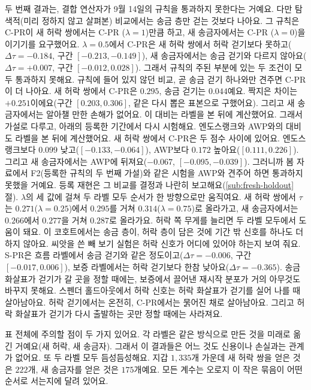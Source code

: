 

두 번째 결과는, 결합 연산자가 9월 14일의 규칙을 통과하지 못한다는 거예요. 다만 탐색적(미리 정하지 않고 살펴본) 비교에서는 송금 층만 걷는 것보다 나아요. 그 규칙은 C-PR이 새 허락 쌍에서는 C-PR ($\lambda=1$)만큼 하고, 새 송금자에서는 C-PR ($\lambda=0$)을 이기기를 요구했어요. $\lambda=0.5$에서 C-PR은 새 허락 쌍에서 허락 걷기보다 못하고($\Delta\tau=-0.184$, 구간 $[-0.213,-0.149]$), 새 송금자에서는 송금 걷기와 다르지 않아요($\Delta\tau=+0.007$, 구간 $[-0.012,0.028]$). 그래서 규칙의 주된 부분에 있는 두 조건이 모두 통과하지 못해요. 규칙에 들어 있지 않던 비교, 곧 송금 걷기 하나와만 견주면 C-PR이 더 나아요. 새 허락 쌍에서 C-PR은 $0.295$, 송금 걷기는 $0.044$예요. 짝지은 차이는 $+0.251$이에요(구간 $[0.203,0.306]$, 같은 다시 뽑은 표본으로 구했어요). 그리고 새 송금자에서는 알아챌 만한 손해가 없어요. 이 대비는 라벨을 본 뒤에 계산했어요. 그래서 가설로 다루고, 아래의 등록한 기간에서 다시 시험해요. 엔도스랭크와 AWP와의 대비도 라벨을 본 뒤에 계산했어요. 새 허락 쌍에서 C-PR은 두 점수 사이에 있어요. 엔도스랭크보다 $0.099$ 낮고($[-0.133,-0.064]$), AWP보다 $0.172$ 높아요($[0.111,0.226]$). 그리고 새 송금자에서는 AWP에 뒤져요($-0.067$, $[-0.095,-0.039]$). 그러니까 봄 자료에서 F2(등록한 규칙의 두 번째 가설)와 같은 시험을 AWP와 견주어 하면 통과하지 못했을 거예요. 등록 재현은 그 비교를 결정과 나란히 보고해요(\ref{sub:fresh-holdout}절). $\lambda$의 세 값에 걸쳐 두 라벨 모두 순서가 한 방향으로만 움직여요. 새 허락 쌍에서 $\tau$는 $0.271$($\lambda=0.25$)에서 $0.295$를 거쳐 $0.314$($\lambda=0.75$)로 올라가고, 새 송금자에서는 $0.266$에서 $0.277$을 거쳐 $0.287$로 올라가요. 허락 쪽 무게를 늘리면 두 라벨 모두에서 도움이 돼요. 이 코호트에서는 송금 층이, 허락 층이 담은 것에 기간 밖 신호를 하나도 더하지 않아요. 씨앗을 쓴 빼 보기 실험은 허락 신호가 어디에 있어야 하는지 보여 줘요. S-PR은 흐름 라벨에서 송금 걷기와 같은 정도이고($\Delta\tau=-0.006$, 구간 $[-0.017,0.006]$), 보증 라벨에서는 허락 걷기보다 한참 낮아요($\Delta\tau=-0.365$). 송금 화살표가 걷기가 갈 곳을 정할 때에는, 보증에서 끌어낸 재시작 분포가 거의 아무것도 바꾸지 못해요. 스펜더 홀드아웃에서 허락 신호는 허락 화살표가 걷기를 실어 나를 때 살아남아요. 허락 걷기에서는 온전히, C-PR에서는 묽어진 채로 살아남아요. 그리고 허락 화살표가 걷기가 다시 출발하는 곳만 정할 때에는 사라져요.

표 전체에 주의할 점이 두 가지 있어요. 각 라벨은 같은 방식으로 만든 것을 미래로 옮긴 거예요(새 허락, 새 송금자). 그래서 이 결과들은 어느 것도 신용이나 손실과는 관계가 없어요. 또 두 라벨 모두 듬성듬성해요. 지갑 $1{,}335$개 가운데 새 허락 쌍을 얻은 것은 $222$개, 새 송금자를 얻은 것은 $175$개예요. 모든 계수는 오로지 이 작은 묶음이 어떤 순서로 서는지에 달려 있어요.

